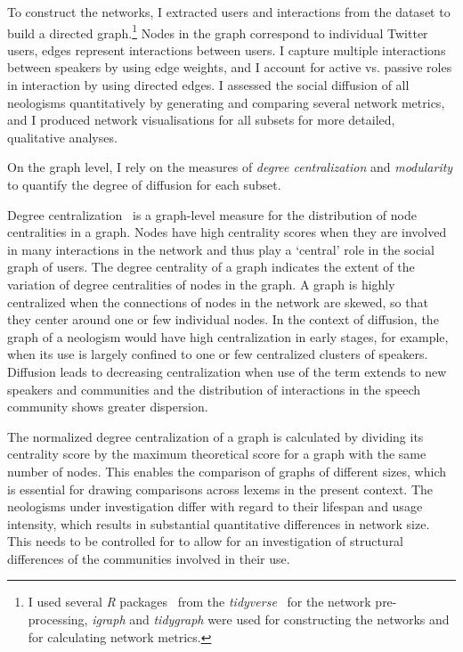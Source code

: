 \documentclass[
  a4paper,
  abstract=on,
  captions=tableabove
  ]{scrartcl}
\begin{document}
  To construct the networks, I extracted users and interactions from the dataset to build a directed graph.\footnote{I used several \emph{R} packages~\parencite{RCoreTeam2018LanguageEnvironment} from the \emph{tidyverse}~\parencite{Wickham2019WelcomeTidyverse} for the network pre-processing, \emph{igraph} and \emph{tidygraph} were used for constructing the networks and for calculating network metrics.} Nodes in the graph correspond to individual Twitter users, edges represent interactions between users. I capture multiple interactions between speakers by using edge weights, and I account for active vs. passive roles in interaction by using directed edges. I assessed the social diffusion of all neologisms quantitatively by generating and comparing several network metrics, and I produced network visualisations for all subsets for more detailed, qualitative analyses.

  On the graph level, I rely on the measures of \emph{degree centralization} and \emph{modularity} to quantify the degree of diffusion for each subset.

  Degree centralization~\parencite{Freeman1978CentralitySocial} is a graph-level measure for the distribution of node centralities in a graph. Nodes have high centrality scores when they are involved in many interactions in the network and thus play a `central' role in the social graph of users. The degree centrality of a graph indicates the extent of the variation of degree centralities of nodes in the graph. A graph is highly centralized when the connections of nodes in the network are skewed, so that they center around one or few individual nodes. In the context of diffusion, the graph of a neologism would have high centralization in early stages, for example, when its use is largely confined to one or few centralized clusters of speakers. Diffusion leads to decreasing centralization when use of the term extends to new speakers and communities and the distribution of interactions in the speech community shows greater dispersion.

  The normalized degree centralization of a graph is calculated by dividing its centrality score by the maximum theoretical score for a graph with the same number of nodes. This enables the comparison of graphs of different sizes, which is essential for drawing comparisons across lexems in the present context. The neologisms under investigation differ with regard to their lifespan and usage intensity, which results in substantial quantitative differences in network size. This needs to be controlled for to allow for an investigation of structural differences of the communities involved in their use.
\end{document}
